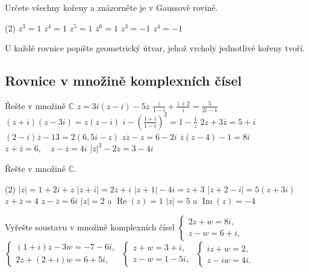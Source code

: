 \begin{exercise}{Určete všechny kořeny a znázorněte je v Gaussově rovině.}
    \begin{tasks}(2)
        \task $z^3=1$
        \task $z^4=1$
        \task $z^5=1$
        \task $z^6=1$
        \task $z^3=-1$
        \task $z^4=-1$
    \end{tasks}

    U každé rovnice popište geometrický útvar, jehož vrcholy jednotlivé kořeny tvoří.
\end{exercise}



\subsection*{Rovnice v množině komplexních čísel}

\begin{exerciseblock}[2]{Řešte v množině $\mathbb{C}$}
    \task $z=3i(z-i)-5z$
    \task $\displaystyle \frac{z}{1-i}+\frac{z+2}{i}=\frac{5}{2i-1}$
    \task $(z+i)(z-3i)=z(z-i)$
    \task $\displaystyle i-\left(\frac{1+i}{1-i}\right)^2=1-\frac1z$
    \task $2z+3\overline z=5+i$
    \task $(2-i)\overline z-13=2(6{,}5i-z)$
    \task $z\overline z-z=6-2i$
    \task $\overline z(z-4)-1=8i$
    \task $z+\overline z=6,\quad z-\overline z=4i$
    \task $|z|^2-2z=3-4i$
\end{exerciseblock}


\begin{exercise}{Řešte v množině $\mathbb{C}$.}
    \begin{tasks}(2)
        \task $|z|=1+2i+z$
        \task $|z+i|=2z+i$
        \task $|z+1|-4i=z+3$
        \task $|z+2-i|=5(z+3i)$
        \task $z+\overline z=4$
        \task $z-\overline z=6i$
        \task $|z|=2$ a $\operatorname{Re}(z)=1$
        \task $|z|=5$ a $\operatorname{Im}(z)=-4$
    \end{tasks}
\end{exercise}


\begin{exerciseblock}[2]{Vyřešte soustavu v množině komplexních čísel}
    \task $\begin{cases}2z+w=8i,\\z-w=6+i,\end{cases}$
    \task $\begin{cases}(1+i)z-3w=-7-6i,\\2z+(2+i)w=6+5i,\end{cases}$
    \task $\begin{cases}z+w=3+i,\\z-w=1-5i,\end{cases}$
    \task $\begin{cases}iz+w=2,\\z-iw=4i.\end{cases}$
\end{exerciseblock}


